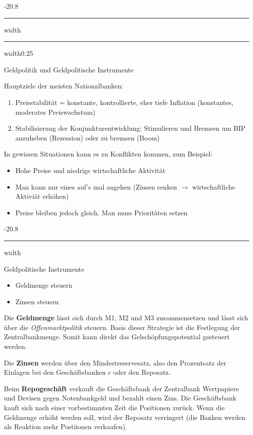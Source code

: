 \documentclass[9pt, landscape, fleqn]{scrartcl}
\makeatletter
\renewcommand{\subsection}{\@startsection{subsection}{1}{0mm}%
{-2\baselineskip}{0.8\baselineskip}%
{\hrule depth 0.2pt width\columnwidth\hrule depth0.75pt
width0.25\columnwidth\vspace*{1.2em}\large\bfseries\rmfamily}}
\renewcommand{\subsubsection}{\@startsection{subsubsection}{1}{0mm}%
{-2\baselineskip}{0.8\baselineskip}%
{\hrule depth 0.2pt width\columnwidth\vspace*{1.2em}\normalsize\bfseries\rmfamily}}
\makeatother
\begin{document}
\begin{multicols*}{3}
\subsection{Geldpolitik und Geldpolitische Instrumente}

Hauptziele der meisten Nationalbanken:

\begin{enumerate}
    \item Preisstabilität = konstante, kontrollierte, eher tiefe Inflation (konstantes, moderates Preiswachstum)
    \item Stabilisierung der Konjunkturentwicklung: Stimulieren und Bremsen um BIP anzuheben (Rezession) oder zu bremsen (Boom)
\end{enumerate}

In gewissen Situationen kann es zu Konflikten kommen, zum Beispiel: 

\begin{itemize}
    \item Hohe Preise und niedrige wirtschaftliche Aktivität
    \item Man kann nur eines auf's mal angehen (Zinsen senken $\rightarrow$ wirtschaftliche Aktiviät erhöhen)
    \item Preise bleiben jedoch gleich. Man muss Prioritäten setzen 
\end{itemize}

\subsubsection{Geldpolitische Instrumente}

\begin{itemize}
    \item Geldmenge steuern 
    \item Zinsen steuern 
\end{itemize}

Die \textbf{Geldmenge} lässt sich durch M1, M2 und M3 zusammensetzen und lässt sich über die \emph{Offenmarktpolitik} steuern. Basis dieser Strategie ist die Festlegung der Zentralbankmenge. Somit kann direkt das Gelschöpfungspotential gesteuert werden. \newline 

Die \textbf{Zinsen} werden über den Mindestreservesatz, also den Prozentsatz der Einlagen bei den Geschäftsbanken $c$ oder den Reposatz. \newline 

Beim \textbf{Repogeschäft} verkauft die Geschäftsbank der Zentralbank Wertpapiere und Devisen gegen Notenbankgeld und bezahlt einen Zins. Die Geschäftsbank kauft sich nach einer vorbestimmten Zeit die Positionen zurück. Wenn die Geldmenge erhöht werden soll, wird der Reposatz verringert (die Banken werden als Reaktion mehr Postiionen verkaufen). \newline 


\end{multicols*}
\end{document}
